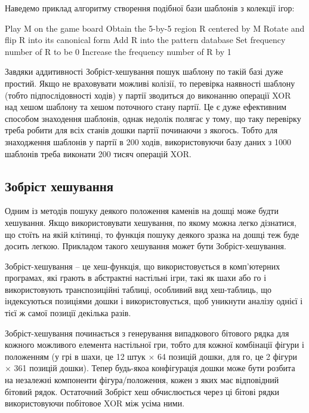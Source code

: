 Наведемо приклад алгоритму створення подібної бази шаблонів з колекції ігор:

\begin{algorithmic}
		 	\State Play M on the game board
			\State Obtain the 5-by-5 region R centered by M
			\State Rotate and flip R into its canonical form
				\State Add R into the pattern database
				\State Set frequency number of R to be 0
			\EndIf
			\State Increase the frequency number of R by 1
		\EndFor
	\EndFor
\end{algorithmic}

Завдяки аддитивності Зобріст-хешування пошук шаблону по такій базі дуже простий. Якщо не враховувати можливі колізії, то перевірка наявності шаблону (тобто підпослідовності ходів) у партії зводиться до виконанню операції XOR над хешом шаблону та хешом поточного стану партії. Це є дуже ефективним способом знаходення шаблонів, однак недолік полягає у тому, що таку перевірку треба робити для всіх станів дошки партії починаючи з якогось. Тобто для знаходження шаблонів у партії в 200 ходів, використовуючи базу даних з 1000 шаблонів треба виконати 200 тисяч операцій XOR.

\subsection{Зобріст хешування}
Одним із методів пошуку деякого положення каменів на дошці може будти хешування. Якщо використовувати хешування, по якому можна легко дізнатися, що стоїть на якій клітинці, то функція пошуку деякого зразка на дошці теж буде досить легкою. Прикладом такого хешування может бути Зобріст-хешування.

Зобріст-хешування -- це хеш-функція, що використовується в комп'ютерних програмах, які грають  в абстрактні настільні ігри, такі як шахи або го і використовують транспозиційні таблиці, особливий вид хеш-таблиць, що індексуються позиціями дошки і використовується, щоб уникнути аналізу однієї і тієї ж самої позиції декілька разів.

Зобріст-хешування починається з генерування випадкового бітового рядка для кожного можливого елемента настільної гри, тобто для кожної комбінації фігури і положенням (у грі в шахи, це 12 штук $\times$ 64 позицій дошки, для го, це 2 фігури $\times$ 361 позицій дошки). Тепер будь-якоа конфігурація дошки може бути розбита на незалежні компоненти фігура/положення, кожен з яких має відповідний бітовий рядок. Остаточний Зобріст хеш обчислюється через ці бітові рядки використовуючи побітовое XOR між усіма ними.

